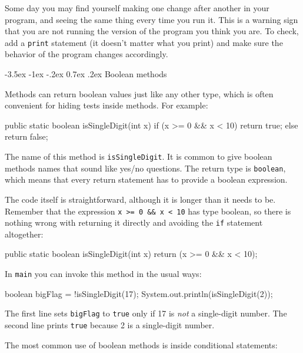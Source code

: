 \documentclass[12pt]{book}
\makeatletter
\renewcommand{\section}{\@startsection {section}{1}{\z@}%
    {-3.5ex \@plus -1ex \@minus -.2ex}%
    {0.7ex \@plus.2ex}%
    {\normalfont\Large\bfseries}}
\theoremstyle{exercise}
\makeatother
\begin{document}
Some day you may find yourself making one change after another in your program, and seeing the same thing every time you run it.
This is a warning sign that you are not running the version of the program you think you are.
To check, add a {\tt print} statement (it doesn't matter what you print) and make sure the behavior of the program changes accordingly.


\section{Boolean methods}
\label{boolean}


Methods can return boolean values just like any other type, which is often convenient for hiding tests inside methods.
For example:

\begin{code}
    public static boolean isSingleDigit(int x) {
        if (x >= 0 && x < 10) {
            return true;
        } else {
            return false;
        }
    }
\end{code}

The name of this method is {\tt isSingleDigit}.
It is common to give boolean methods names that sound like yes/no questions.
The return type is {\tt boolean}, which means that every return statement has to provide a boolean expression.

The code itself is straightforward, although it is longer than it needs to be.
Remember that the expression {\tt x >= 0 \&\& x < 10} has type boolean, so there is nothing wrong with returning it directly and avoiding the {\tt if} statement altogether:

\begin{code}
    public static boolean isSingleDigit(int x) {
        return (x >= 0 && x < 10);
    }
\end{code}

In {\tt main} you can invoke this method in the usual ways:

\begin{code}
    boolean bigFlag = !isSingleDigit(17);
    System.out.println(isSingleDigit(2));
\end{code}

The first line sets {\tt bigFlag} to {\tt true} only if 17 is {\em not} a single-digit number.
The second line prints {\tt true} because 2 is a single-digit number.

The most common use of boolean methods is inside conditional statements:
\end{document}
